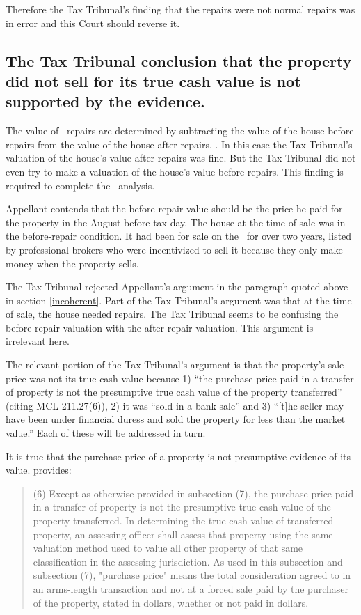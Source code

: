 \documentclass[12pt,\documentclassflag]{michiganCourtOfAppealsBrief}
\def\mathieuGast{\pincite[l]{MCL}{211.27(2)}}
\begin{document}
Therefore the Tax Tribunal's finding that the repairs were not normal repairs was in error and this Court should reverse it.

\subsection{The Tax Tribunal conclusion that the property did not sell for its true cash value is not supported by the evidence.}

The value of \mathieuGast\ repairs are determined by subtracting the value of the house before repairs from the value of the house after repairs. . In this case the Tax Tribunal's valuation of the house's value after repairs was fine. But the Tax Tribunal did not even try to make a valuation of the house's value before repairs. This finding is required to complete the \mathieuGast\ analysis.

Appellant contends that the before-repair value should be the price he paid for the property in the August before tax day. The house at the time of sale was in the before-repair condition. It had been for sale on the \MLS\ for over two years, listed by professional brokers who were incentivized to sell it because they only make money when the property sells.

The Tax Tribunal rejected Appellant's argument in the paragraph quoted above in section \ref{incoherent}. Part of the Tax Tribunal's argument was that at the time of sale, the house needed repairs. The Tax Tribunal seems to be confusing the before-repair valuation with the after-repair valuation. This argument is irrelevant here.

The relevant portion of the Tax Tribunal's argument is that the property's sale price was not its true cash value because 1) ``the purchase price paid in a transfer of property is not the presumptive true cash value of the property transferred'' (citing MCL 211.27(6)), 2)  it was ``sold in a bank sale'' and 3) ``[t]he seller may have been under financial duress and sold the property for less than the market value.'' Each of these will be addressed in turn.

It is true that the purchase price of a property is not presumptive evidence of its value.  provides:

\begin{quote} (6) Except as otherwise provided in subsection (7), the purchase price paid in a transfer of property is not the presumptive true cash value of the property transferred. In determining the true cash value of transferred property, an assessing officer shall assess that property using the same valuation method used to value all other property of that same classification in the assessing jurisdiction. As used in this subsection and subsection (7), "purchase price" means the total consideration agreed to in an arms-length transaction and not at a forced sale paid by the purchaser of the property, stated in dollars, whether or not paid in dollars.
\end{quote}
\end{document}
